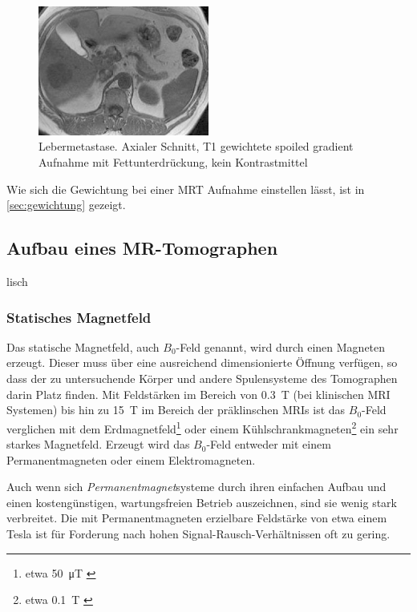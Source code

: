 \begin{figure}[H]
	\centering
	\includegraphics[width=0.5\textwidth]{img/metastase.png}
	\caption[Lebermetastase]{Lebermetastase. Axialer Schnitt, T1 gewichtete spoiled gradient Aufnahme mit Fettunterdrückung, kein Kontrastmittel \cite[S.~872]{Reiser2008}}
	\label{fig:metastase}
\end{figure}

Wie sich die Gewichtung bei einer MRT Aufnahme einstellen lässt, ist in \autoref{sec:gewichtung} gezeigt.



\subsection{Aufbau eines MR-Tomographen}
lisch
\subsubsection{Statisches Magnetfeld}
Das statische Magnetfeld, auch $B_0$-Feld genannt, wird durch einen Magneten erzeugt. Dieser muss über eine ausreichend dimensionierte Öffnung verfügen, so dass der zu untersuchende Körper und andere Spulensysteme des Tomographen darin Platz finden. Mit Feldstärken im Bereich von \SI{0.3}{\tesla} (bei klinischen MRI Systemen) bis hin zu \SI{15}{\tesla} im Bereich der präklinschen MRIs ist das $B_0$-Feld verglichen mit dem Erdmagnetfeld\footnote{etwa \SI{50}{\micro\tesla} \cite{Enc1994}} oder einem Kühlschrankmagneten\footnote{etwa \SI{0.1}{\tesla} \cite{LHC2018}} ein sehr starkes Magnetfeld.
Erzeugt wird das $B_0$-Feld entweder mit einem Permanentmagneten oder einem Elektromagneten. 

Auch wenn sich \textit{Permanentmagnet}systeme durch ihren einfachen Aufbau und einen kostengünstigen, wartungsfreien Betrieb auszeichnen, sind sie wenig stark verbreitet. Die mit Permanentmagneten erzielbare Feldstärke von etwa einem Tesla ist für Forderung nach hohen Signal-Rausch-Verhältnissen oft zu gering.

